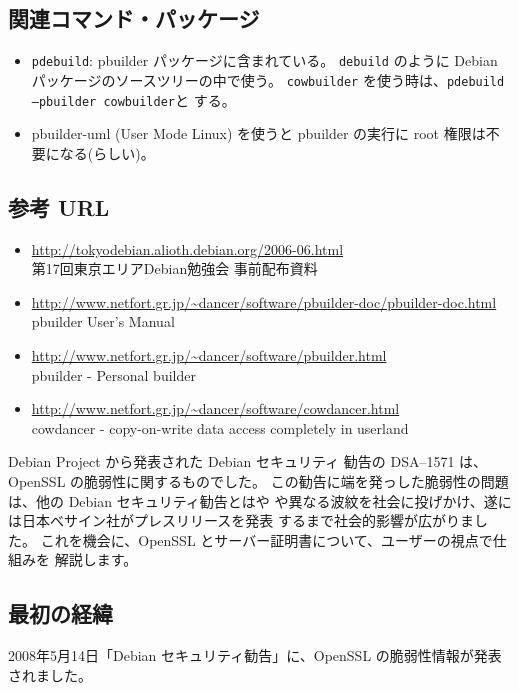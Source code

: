 \documentclass[mingoth,a4paper]{jsarticle}
\begin{document}
\subsection{関連コマンド・パッケージ}

\begin{itemize}
\item \texttt{pdebuild}: pbuilder パッケージに含まれている。
  \texttt{debuild} のように Debian パッケージのソースツリーの中で使う。
  \texttt{cowbuilder} を使う時は、\texttt{pdebuild --pbuilder cowbuilder}と
  する。
\item pbuilder-uml (User Mode Linux) を使うと pbuilder の実行に
  root 権限は不要になる(らしい)。
\end{itemize}

\subsection{参考 URL}

\begin{itemize}
\item \url{http://tokyodebian.alioth.debian.org/2006-06.html} \\
  第17回東京エリアDebian勉強会 事前配布資料
\item \url{http://www.netfort.gr.jp/~dancer/software/pbuilder-doc/pbuilder-doc.html} \\
  pbuilder User's Manual
\item \url{http://www.netfort.gr.jp/~dancer/software/pbuilder.html} \\
  pbuilder - Personal builder
\item \url{http://www.netfort.gr.jp/~dancer/software/cowdancer.html} \\
  cowdancer - copy-on-write data access completely in userland
\end{itemize}


Debian Project から発表された Debian セキュリティ
勧告の DSA--1571 は、 OpenSSL の脆弱性に関するものでした。
この勧告に端を発っした脆弱性の問題は、他の Debian セキュリティ勧告とはや
や異なる波紋を社会に投げかけ、遂には日本べサイン社がプレスリリースを発表
するまで社会的影響が広がりました。
これを機会に、OpenSSL とサーバー証明書について、ユーザーの視点で仕組みを
解説します。

\subsection{最初の経緯}
2008年5月14日「Debian セキュリティ勧告」に、OpenSSL の脆弱性情報が発表されました。
\end{document}
